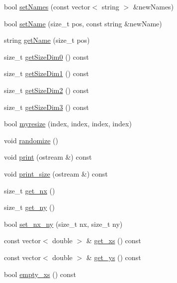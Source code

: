 \begin{DoxyCompactItemize}
\item 
bool \mbox{\hyperlink{class_array4_d_af68fe1f08ec29e4f9a14df33a551457f}{set\+Names}} (const vector$<$ string $>$ \&new\+Names)
\item 
bool \mbox{\hyperlink{class_array4_d_aebbb2b6bc7d699ebe405852509001c9d}{set\+Name}} (size\+\_\+t pos, const string \&new\+Name)
\item 
string \mbox{\hyperlink{class_array4_d_a0cd461b4f7d2b9c58112342ce7160d71}{get\+Name}} (size\+\_\+t pos)
\item 
size\+\_\+t \mbox{\hyperlink{class_array4_d_afc2d361e388a5faba62caef697033911}{get\+Size\+Dim0}} () const
\item 
size\+\_\+t \mbox{\hyperlink{class_array4_d_a32f89196e8a5384f8a207812376f716d}{get\+Size\+Dim1}} () const
\item 
size\+\_\+t \mbox{\hyperlink{class_array4_d_abc321f73fd2665ac1c58afaf3ebe60e6}{get\+Size\+Dim2}} () const
\item 
size\+\_\+t \mbox{\hyperlink{class_array4_d_af767db0beba39cd815b903a8076d2695}{get\+Size\+Dim3}} () const
\item 
bool \mbox{\hyperlink{class_array4_d_ae829ad7badd47b721a9ecea2324f3168}{myresize}} (index, index, index, index)
\item 
void \mbox{\hyperlink{class_array4_d_a15626fe44d3792ccc2822afb30bcbd98}{randomize}} ()
\item 
void \mbox{\hyperlink{class_array4_d_ac31128a6e5ae4659e6be655fecfd6d5c}{print}} (ostream \&) const
\item 
void \mbox{\hyperlink{class_array4_d_a3a807dbd6c3c0d3f6e79b486549dc9f1}{print\+\_\+size}} (ostream \&) const
\item 
size\+\_\+t \mbox{\hyperlink{class_array4_d_a2f9f3a7f699f705ebbc3067adf923922}{get\+\_\+nx}} ()
\item 
size\+\_\+t \mbox{\hyperlink{class_array4_d_a6f75a07d72213eff83aabbfd8442d1d3}{get\+\_\+ny}} ()
\item 
bool \mbox{\hyperlink{class_array4_d_a4071001d8fd5248bcaf89c54556a6fe2}{set\+\_\+nx\+\_\+ny}} (size\+\_\+t nx, size\+\_\+t ny)
\item 
const vector$<$ double $>$ \& \mbox{\hyperlink{class_array4_d_a5b72fa60e0feacd807d4d2e7bd1bf5fd}{get\+\_\+xs}} () const
\item 
const vector$<$ double $>$ \& \mbox{\hyperlink{class_array4_d_a3f6fa1fc8bc07a3aa51cbdada40e25e7}{get\+\_\+ys}} () const
\item 
bool \mbox{\hyperlink{class_array4_d_a66b2635ff1ce8ef57e9c55bba8e2bbda}{empty\+\_\+xs}} () const

\end{DoxyCompactItemize}
